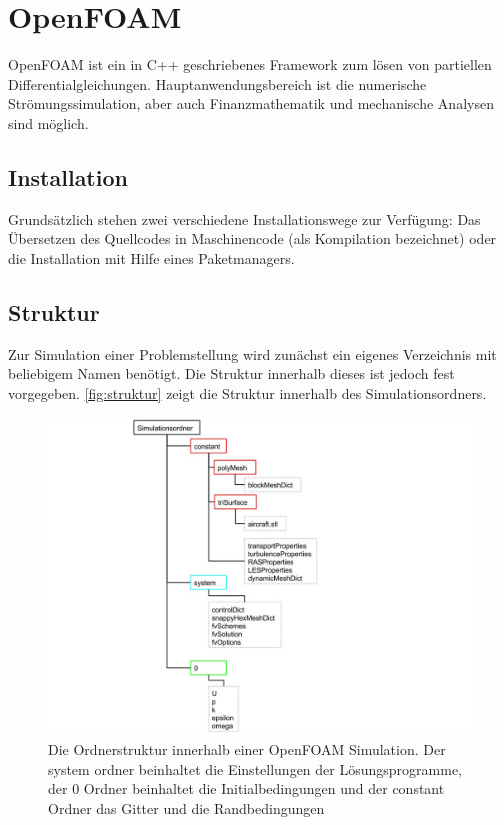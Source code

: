 \chapter{OpenFOAM}

OpenFOAM ist ein in C++ geschriebenes Framework zum lösen von partiellen Differentialgleichungen. Hauptanwendungsbereich ist die numerische Strömungssimulation, aber auch Finanzmathematik und mechanische Analysen sind möglich. 

\section{Installation}

Grundsätzlich stehen zwei verschiedene Installationswege zur Verfügung: Das Übersetzen des Quellcodes in Maschinencode (als Kompilation bezeichnet) oder die Installation mit Hilfe eines Paketmanagers.


\section{Struktur}

Zur Simulation einer Problemstellung wird zunächst ein eigenes Verzeichnis mit beliebigem Namen benötigt.
Die Struktur innerhalb dieses ist jedoch fest vorgegeben. \autoref{fig:struktur} zeigt die Struktur innerhalb des Simulationsordners.

\begin{figure}
\centering
\includegraphics[width=\linewidth]{Abbildungen/Struktur}
\caption[Struktur einer OpenFOAM Simulation]{Die Ordnerstruktur innerhalb einer OpenFOAM Simulation. Der system ordner beinhaltet die Einstellungen der Lösungsprogramme, der 0 Ordner beinhaltet die Initialbedingungen und der constant Ordner das Gitter und die Randbedingungen}
\label{fig:struktur}
\end{figure}

